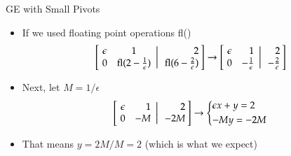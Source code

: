 \documentclass[10pt]{beamer}
\begin{document}
\begin{frame}{GE with Small Pivots}

\begin{itemize}

    \item If we used floating point operations fl()
    \begin{equation*}
    \left[
           \left.\negthickspace\begin{array}{ccc} \epsilon &  1 \\
                                                    0 &  \text{fl}(2-\frac{1}{\epsilon})  \end{array}
           \right|\begin{array}{r} 2 \\  \text{fl}(6-\frac{2}{\epsilon}) \end{array}\negthickspace\right]
           \rightarrow 
               \left[
           \left.\negthickspace\begin{array}{rrrr} \epsilon &  1 \\
                                                    0 &  -\frac{1}{\epsilon}   \end{array}
           \right|\begin{array}{r} 2 \\  -\frac{2}{\epsilon} \end{array}\negthickspace\right]
    \end{equation*}

    \item Next, let $M=1/\epsilon$
    $$
                   \left[
           \left.\negthickspace\begin{array}{rrrr} \epsilon &  1 \\
                                                    0 &  -M   \end{array}
           \right|\begin{array}{r} 2 \\  -2M \end{array}\negthickspace\right]
           \rightarrow 
           \begin{dcases}
               \epsilon x + y = 2\\
               -My = -2M
           \end{dcases}
    $$
    \item That means $y=2M/M=2$ (which is what we expect) 
    \vfill 
\end{itemize}
    

\end{frame}
\end{document}
